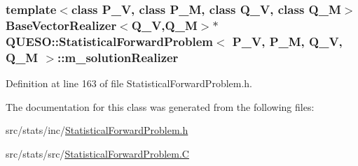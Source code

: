 \hypertarget{class_q_u_e_s_o_1_1_statistical_forward_problem_a0b855f085c84bd113827951f3c424d2d}{
\subsubsection[{m\-\_\-solution\-Realizer}]{\setlength{\rightskip}{0pt plus 5cm}template$<$class P\-\_\-\-V, class P\-\_\-\-M, class Q\-\_\-\-V, class Q\-\_\-\-M$>$ {\bf Base\-Vector\-Realizer}$<$Q\-\_\-\-V,Q\-\_\-\-M$>$$\ast$ {\bf Q\-U\-E\-S\-O\-::\-Statistical\-Forward\-Problem}$<$ P\-\_\-\-V, P\-\_\-\-M, Q\-\_\-\-V, Q\-\_\-\-M $>$\-::m\-\_\-solution\-Realizer\hspace{0.3cm}{\ttfamily [private]}}}\label{class_q_u_e_s_o_1_1_statistical_forward_problem_a0b855f085c84bd113827951f3c424d2d}


Definition at line 163 of file Statistical\-Forward\-Problem.\-h.



The documentation for this class was generated from the following files\-:\begin{DoxyCompactItemize}
\item 
src/stats/inc/\hyperlink{_statistical_forward_problem_8h}{Statistical\-Forward\-Problem.\-h}\item 
src/stats/src/\hyperlink{_statistical_forward_problem_8_c}{Statistical\-Forward\-Problem.\-C}\end{DoxyCompactItemize}
